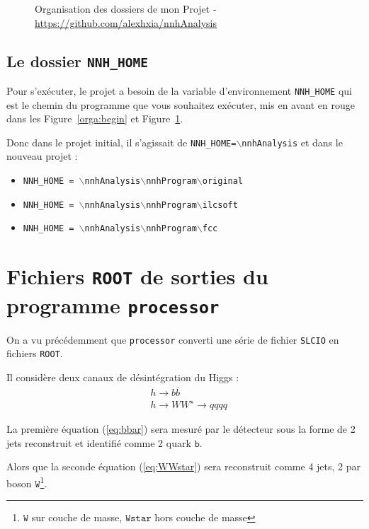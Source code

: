 \documentclass[10pt,a4paper]{report}
\newcommand{\ROOT}{\texttt{ROOT}\xspace}
\newcommand{\SLCIO}{\texttt{SLCIO}\xspace}
\newcommand{\processor}{\texttt{processor}\xspace}
\newcommand{\particle}[1]{$\texttt{#1}$}
\newcommand{\bbar}{\overline{b}}
\newcommand{\Wstar}{W^{\star}}
\begin{document}
\begin{appendix}
\begin{figure}[h!]
\begin{tikzpicture}
	\end{tikzpicture}
	\caption{
		Organisation des dossiers de mon Projet - \url{https://github.com/alexhxia/nnhAnalysis}
	}
	\label{orga:end}
\end{figure}

\section{Le dossier \texttt{NNH\_HOME}}

Pour s'exécuter, le projet a besoin de la variable d'environnement \texttt{NNH\_HOME} qui est le chemin du programme que vous souhaitez exécuter,  mis en avant en rouge dans les Figure~\ref{orga:begin} et Figure~\ref{orga:end}.

Donc dans le projet initial, il s'agissait de \texttt{NNH\_HOME=$\backslash$nnhAnalysis} et dans le nouveau projet :
\begin{itemize}
	\item \texttt{NNH\_HOME = $\backslash$nnhAnalysis$\backslash$nnhProgram$\backslash$original}
	\item \texttt{NNH\_HOME = $\backslash$nnhAnalysis$\backslash$nnhProgram$\backslash$ilcsoft}
	\item \texttt{NNH\_HOME = $\backslash$nnhAnalysis$\backslash$nnhProgram$\backslash$fcc}
\end{itemize}


\chapter{Fichiers \ROOT de sorties du programme \processor}

On a vu précédemment que \processor converti une série de fichier \SLCIO en fichiers \ROOT. 

Il considère deux canaux de désintégration du Higgs :
\begin{align}
	& h \longrightarrow b \bbar \label{eq:bbar}\\
	& h \longrightarrow W \Wstar \longrightarrow qqqq \label{eq:WWstar}
\end{align}

La première équation (\ref{eq:bbar}) sera mesuré par le détecteur sous la forme de 2 jets reconstruit et identifié comme 2 quark \particle{b}.

Alors que la seconde équation (\ref{eq:WWstar}) sera reconstruit comme 4 jets, 2 par boson \particle{W}\footnote{\particle{W} sur couche de masse, \particle{Wstar} hors couche de masse}.

\end{appendix}
\end{document}
